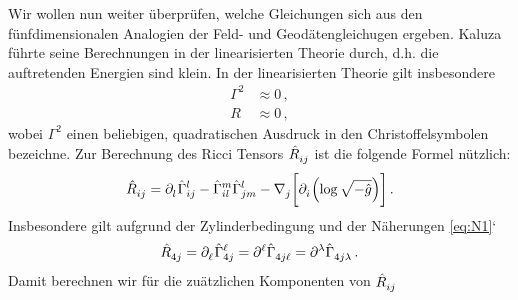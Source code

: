 Wir wollen nun weiter überprüfen, welche Gleichungen sich aus den
fünfdimensionalen Analogien der Feld- und Geodätengleichugen ergeben.
Kaluza führte seine Berechnungen in der linearisierten Theorie durch, d.h. 
die auftretenden Energien sind klein.
In der linearisierten Theorie gilt insbesondere
\begin{align}
\Gamma^2&\approx 0\tag{N1}\label{eq:N1}\,,\\
R&\approx 0\tag{N2}\label{eq:N2}\,,
\end{align}
wobei $\Gamma^2$ einen beliebigen, quadratischen Ausdruck in den
Christoffelsymbolen bezeichne.
Zur Berechnung des Ricci Tensors
$\tensor{\hat{R}}{_i_j}$ ist die folgende Formel nützlich:
\begin{equation}
\tensor{\hat{R}}{_i_j}=\tensor{\partial}{_l}\tensor*{\hat{\Gamma}}{^l_i_j}
-\tensor*{\hat{\Gamma}}{^m_i_l}\tensor*{\hat{\Gamma}}{^l_j_m}
-\tensor{\nabla}{_j}\left[\tensor{\partial}{_i}\left(\log\sqrt{-\hat{g}}\right)\right]\,
.\end{equation}
Insbesondere gilt aufgrund der Zylinderbedingung und der Näherungen
\eqref{eq:N1}`
\begin{equation}
\tensor{\hat{R}}{_4_j}=\tensor{\partial}{_\ell}\tensor*{\hat{\Gamma}}{^\ell_4_j}
=\tensor{\partial}{^\ell}\tensor*{\hat{\Gamma}}{_4_j_\ell}
=\tensor{\partial}{^\lambda}\tensor*{\hat{\Gamma}}{_4_j_\lambda}\,.
\end{equation}
Damit berechnen wir für die zuätzlichen Komponenten von $\tensor{\hat{R}}{_i_j}$ 
